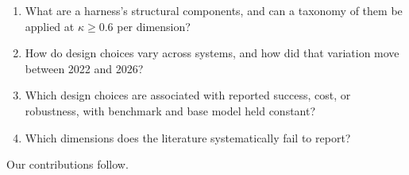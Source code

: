 \begin{enumerate}
  \item[\textbf{RQ1}] What are a harness's structural components, and can a taxonomy of them be applied
  at $\kappa \ge 0.6$ per dimension?
  \item[\textbf{RQ2}] How do design choices vary across systems, and how did that variation move
  between 2022 and 2026?
  \item[\textbf{RQ3}] Which design choices are associated with reported success, cost, or robustness,
  with benchmark and base model held constant?
  \item[\textbf{RQ4}] Which dimensions does the literature systematically fail to report?
\end{enumerate}

Our contributions follow.

